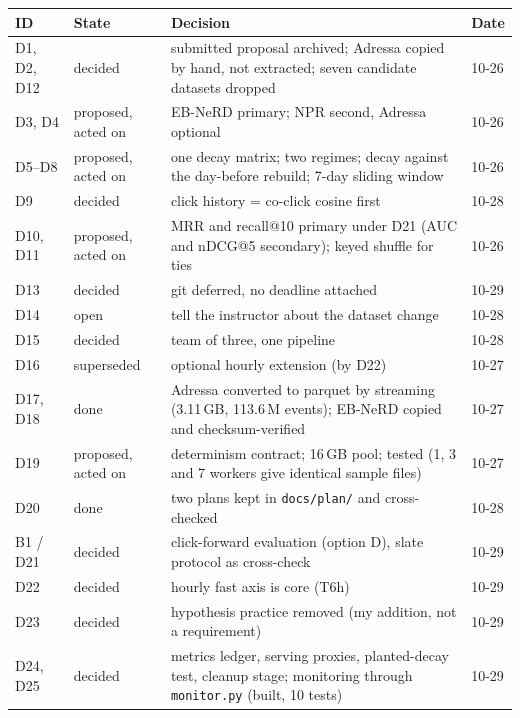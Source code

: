 \documentclass[9pt,a4paper]{article}
\begin{document}
\begin{center}
\scriptsize
\begin{tabularx}{\linewidth}{@{}l p{1.55cm} X l@{}}
\toprule
\textbf{ID} & \textbf{State} & \textbf{Decision} & \textbf{Date}\\
\midrule
D1, D2, D12 & decided & submitted proposal archived; Adressa copied by hand, not extracted; seven candidate datasets dropped & 10-26\\
D3, D4 & proposed, acted on & EB-NeRD primary; NPR second, Adressa optional & 10-26\\
D5--D8 & proposed, acted on & one decay matrix; two regimes; decay against the day-before rebuild; 7-day sliding window & 10-26\\
D9 & decided & click history = co-click cosine first & 10-28\\
D10, D11 & proposed, acted on & MRR and recall@10 primary under D21 (AUC and nDCG@5 secondary); keyed shuffle for ties & 10-26\\
D13 & decided & git deferred, no deadline attached & 10-29\\
D14 & open & tell the instructor about the dataset change & 10-28\\
D15 & decided & team of three, one pipeline & 10-28\\
D16 & superseded & optional hourly extension (by D22) & 10-27\\
D17, D18 & done & Adressa converted to parquet by streaming (3.11\,GB, 113.6\,M events); EB-NeRD copied and checksum-verified & 10-27\\
D19 & proposed, acted on & determinism contract; 16\,GB pool; tested (1, 3 and 7 workers give identical sample files) & 10-27\\
D20 & done & two plans kept in \texttt{docs/plan/} and cross-checked & 10-28\\
B1 / D21 & decided & click-forward evaluation (option D), slate protocol as cross-check & 10-29\\
D22 & decided & hourly fast axis is core (T6h) & 10-29\\
D23 & decided & hypothesis practice removed (my addition, not a requirement) & 10-29\\
D24, D25 & decided & metrics ledger, serving proxies, planted-decay test, cleanup stage; monitoring through \texttt{monitor.py} (built, 10 tests) & 10-29\\
\bottomrule
\end{tabularx}
\end{center}
\end{document}
